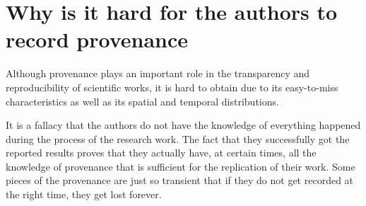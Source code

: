 \section{Why is it hard for the authors to record provenance}
Although provenance plays an important role in the transparency and reproducibility of scientific 
works, it is hard to obtain due to its easy-to-miss characteristics as well as its spatial and temporal distributions.

It is a fallacy that the authors do not have the knowledge of everything happened during the process 
of the research work. The fact that they successfully got the reported results proves that they 
actually have, at certain times, all the knowledge of provenance that is sufficient for the 
replication of their work. Some pieces of the provenance are just so transient that if they do not 
get recorded at the right time, they get lost forever.

